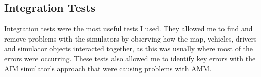 \subsection{Integration Tests}
\label{subsec:Integration Tests}
Integration tests were the most useful tests I used. They allowed me to find and remove problems with the simulators by observing how the map, vehicles, drivers and simulator objects interacted together, as this was usually where most of the errors were occurring. These tests also allowed me to identify key errors with the AIM simulator's approach that were causing problems with AMM.